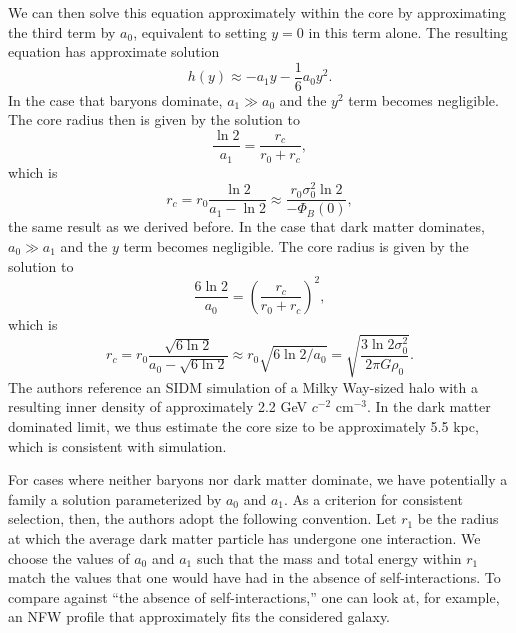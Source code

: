 We can then solve this equation approximately within the core by approximating
the third term by $a_0$, equivalent to setting $y = 0$ in this term alone. The
resulting equation has approximate solution 
\begin{equation}
    h(y) \approx -a_1 y - \frac{1}{6} a_0 y^2.
\end{equation}
In the case that baryons dominate, $a_1 \gg a_0$ and the $y^2$ term becomes
negligible. The core radius then is given by the solution to 
\begin{equation}
    \frac{\ln 2}{a_1} = \frac{r_c}{r_0 + r_c},
\end{equation}
which is 
\begin{equation}
    r_c = r_0 \frac{\ln 2}{a_1 - \ln 2} \approx 
    \frac{r_0 \sigma_0^2 \ln 2}{-\Phi_B(0)},
\end{equation}
the same result as we derived before. In the case that dark matter dominates,
$a_0 \gg a_1$ and the $y$ term becomes negligible. The core radius is given by
the solution to 
\begin{equation}
    \frac{6 \ln 2}{a_0} = \left(\frac{r_c}{r_0 + r_c}\right)^2,
\end{equation}
which is 
\begin{equation}
    r_c = r_0 \frac{\sqrt{6\ln 2}}{a_0 - \sqrt{6\ln 2}} \approx 
    r_0 \sqrt{6 \ln 2 / a_0} = \sqrt{\frac{3 \ln 2 \sigma_0^2}{2 \pi G \rho_0}}.
\end{equation}
The authors reference an SIDM simulation of a Milky Way-sized halo with a
resulting inner density of approximately 2.2 GeV $c^{-2}$ cm$^{-3}$. In the dark
matter dominated limit, we thus estimate the core size to be approximately 5.5
kpc, which is consistent with simulation. 

For cases where neither baryons nor dark matter dominate, we have potentially a
family a solution parameterized by $a_0$ and $a_1$. As a criterion for
consistent selection, then, the authors adopt the following convention. Let
$r_1$ be the radius at which the average dark matter particle has undergone one
interaction. We choose the values of $a_0$ and $a_1$ such that the mass and
total energy within $r_1$ match the values that one would have had in the
absence of self-interactions. To compare against ``the absence of
self-interactions,'' one can look at, for example, an NFW profile that
approximately fits the considered galaxy.

